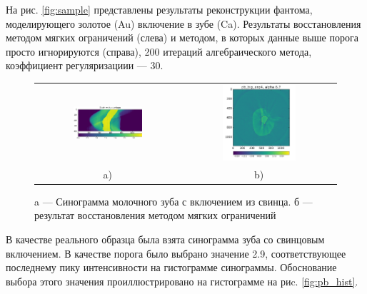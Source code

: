 На рис. \ref{fig:sample} представлены результаты реконструкции фантома, моделирующего золотое (Au) включение в зубе (Ca).
Результаты восстановления методом мягких ограничений (слева) и методом, в которых данные выше порога просто игнорируются (справа), 200 итераций алгебраического метода, коэффициент регуляризациии --- 30.

\begin{figure}
\centering
\begin{tabular}{@{}c@{}c}
    \includegraphics[width=0.50\textwidth]{Dissertation/images/part2_img/tooth_sino}
&
    \includegraphics[width=0.50\textwidth]{Dissertation/images/part2_img/soft_ineq_pb_tooth}
\\
   \small a) & \small b)
\end{tabular}
  \caption{a --- Синограмма молочного зуба с включением из свинца. б --- результат восстановления методом мягких ограничений}
\label{fig:tooth_sino_rec}
\end{figure}

В качестве реального образца была взята синограмма зуба со свинцовым включением.
В качестве порога было выбрано значение 2.9, соответствующее последнему пику интенсивности на гистограмме синограммы.
Обоснование выбора этого значения проиллюстрировано на гистограмме на риc. \ref{fig:pb_hist}.


